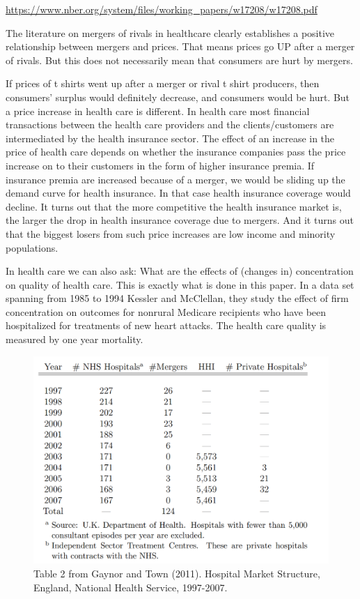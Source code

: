 \documentclass[
]{book}
\begin{document}
\url{https://www.nber.org/system/files/working_papers/w17208/w17208.pdf}

The literature on mergers of rivals in healthcare clearly establishes a positive relationship between mergers and prices. That means prices go UP after a merger of rivals. But this does not necessarily mean that consumers are hurt by mergers.

If prices of t shirts went up after a merger or rival t shirt producers, then consumers' surplus would definitely decrease, and consumers would be hurt. But a price increase in health care is different. In health care most financial transactions between the health care providers and the clients/customers are intermediated by the health insurance sector. The effect of an increase in the price of health care depends on whether the insurance companies pass the price increase on to their customers in the form of higher insurance premia. If insurance premia are increased because of a merger, we would be sliding up the demand curve for health insurance. In that case health insurance coverage would decline. It turns out that the more competitive the health insurance market is, the larger the drop in health insurance coverage due to mergers. And it turns out that the biggest losers from such price increases are low income and minority populations.

In health care we can also ask: What are the effects of (changes in) concentration on quality of health care. This is exactly what is done in this paper. In a data set spanning from 1985 to 1994 Kessler and McClellan, they study the effect of firm concentration on outcomes for nonrural Medicare recipients who have been hospitalized for treatments of new heart attacks. The
health care quality is measured by one year mortality.

\begin{figure}

{\centering \includegraphics[width=0.7\linewidth]{img/oligopoly/papertable4} 

}

\caption{Table 2 from Gaynor and Town (2011). Hospital Market Structure, England, National Health Service, 1997-2007.}\label{fig:oligopolypapertable4}
\end{figure}
\end{document}
